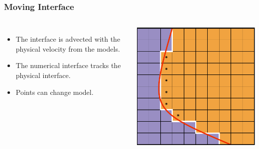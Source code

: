 \documentclass{beamer}
\begin{document}
\begin{frame}
\frametitle{Moving Interface}
\begin{columns}
\begin{itemize}
\item{The interface is advected with the physical velocity from the models.}
\item{The numerical interface tracks the physical interface.}
\item{Points can change model.}
\end{itemize}
\includegraphics[width=\textwidth]{../images/multimodel_captured_2.pdf}
\end{columns}
\end{frame}
\end{document}
